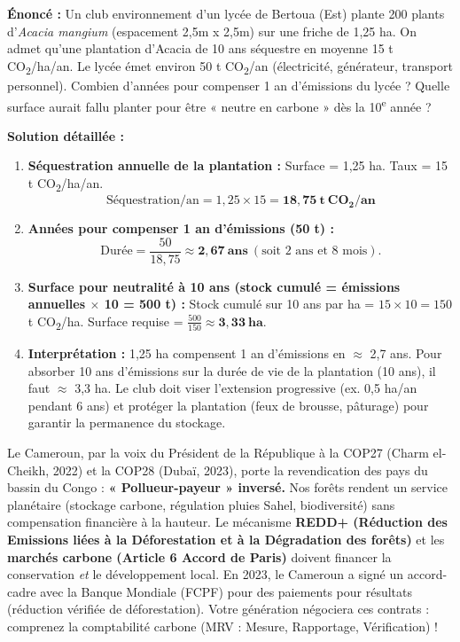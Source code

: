 \documentclass[11pt]{article}
\begin{document}
\begin{exoresolu}
\textbf{Énoncé :} Un club environnement d'un lycée de Bertoua (Est) plante 200 plants d'\emph{Acacia mangium} (espacement 2,5m x 2,5m) sur une friche de 1,25 ha. On admet qu'une plantation d'Acacia de 10 ans séquestre en moyenne 15 t CO\textsubscript{2}/ha/an. Le lycée émet environ 50 t CO\textsubscript{2}/an (électricité, générateur, transport personnel). Combien d'années pour compenser 1 an d'émissions du lycée ? Quelle surface aurait fallu planter pour être « neutre en carbone » dès la 10\textsuperscript{e} année ?

\textbf{Solution détaillée :}
\begin{enumerate}
    \item \textbf{Séquestration annuelle de la plantation :} Surface = 1,25 ha. Taux = 15 t CO\textsubscript{2}/ha/an.
    \[ \text{Séquestration/an} = 1,25 \times 15 = \mathbf{18,75\ t\ CO_2/an} \]
    \item \textbf{Années pour compenser 1 an d'émissions (50 t) :}
    \[ \text{Durée} = \frac{50}{18,75} \approx \mathbf{2,67\ ans} \ (\text{soit 2 ans et 8 mois}). \]
    \item \textbf{Surface pour neutralité à 10 ans (stock cumulé = émissions annuelles $\times$ 10 = 500 t) :}
    Stock cumulé sur 10 ans par ha = $15 \times 10 = 150$ t CO\textsubscript{2}/ha.
    Surface requise = $\frac{500}{150} \approx \mathbf{3,33\ ha}$.
    \item \textbf{Interprétation :} 1,25 ha compensent 1 an d'émissions en $\approx$ 2,7 ans. Pour absorber 10 ans d'émissions sur la durée de vie de la plantation (10 ans), il faut $\approx$ 3,3 ha. Le club doit viser l'extension progressive (ex. 0,5 ha/an pendant 6 ans) et protéger la plantation (feux de brousse, pâturage) pour garantir la permanence du stockage.
\end{enumerate}
\end{exoresolu}

\begin{savaistu}
Le Cameroun, par la voix du Président de la République à la COP27 (Charm el-Cheikh, 2022) et la COP28 (Dubaï, 2023), porte la revendication des pays du bassin du Congo : \textbf{« Pollueur-payeur » inversé.} Nos forêts rendent un service planétaire (stockage carbone, régulation pluies Sahel, biodiversité) sans compensation financière à la hauteur. Le mécanisme \textbf{REDD+ (Réduction des Emissions liées à la Déforestation et à la Dégradation des forêts)} et les \textbf{marchés carbone (Article 6 Accord de Paris)} doivent financer la conservation \emph{et} le développement local. En 2023, le Cameroun a signé un accord-cadre avec la Banque Mondiale (FCPF) pour des paiements pour résultats (réduction vérifiée de déforestation). Votre génération négociera ces contrats : comprenez la comptabilité carbone (MRV : Mesure, Rapportage, Vérification) !
\end{savaistu}
\end{document}
